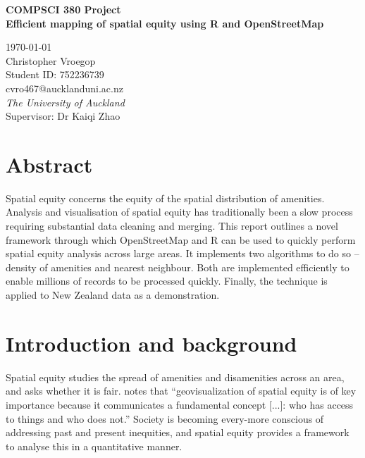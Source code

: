 \documentclass[12pt,a4paper]{article}
\begin{document}
\begin{Large}
\begin{center}
\textbf{COMPSCI 380 Project} \\
\textbf{Efficient mapping of spatial equity using R and OpenStreetMap} \\
\end{center}
\end{Large}

\begin{center}
\today \\
Christopher Vroegop \\
Student ID: 752236739 \\
cvro467@aucklanduni.ac.nz \\
\emph{The University of Auckland} \\
Supervisor: Dr Kaiqi Zhao
\end{center}



\section{Abstract}
\label{sec:abstract}

Spatial equity concerns the equity of the spatial distribution of amenities. Analysis and visualisation of spatial equity has traditionally been a slow process requiring substantial data cleaning and merging. This report outlines a novel framework through which OpenStreetMap and R can be used to quickly perform spatial equity analysis across large areas. It implements two algorithms to do so -- density of amenities and nearest neighbour. Both are implemented efficiently to enable millions of records to be processed quickly. Finally, the technique is applied to New Zealand data as a demonstration.

\section{Introduction and background}
\label{sec:intro}


Spatial equity studies the spread of amenities and disamenities across an area, and asks whether it is fair. \cite{talen:2011} notes that ``geovisualization of spatial equity is of key importance because it communicates a fundamental concept [...]: who has access to things and who does not.'' Society is becoming every-more conscious of addressing past and present inequities, and spatial equity provides a framework to analyse this in a quantitative manner.
\end{document}
